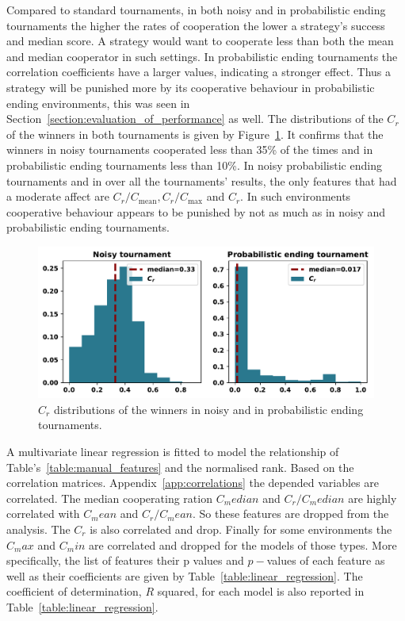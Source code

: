 \documentclass{article}
\begin{document}
Compared to standard tournaments, in both noisy and in probabilistic ending
tournaments the higher the rates of cooperation the lower a strategy's success
and median score. A strategy would want to cooperate less than both
the mean and median cooperator in such settings. In probabilistic ending
tournaments the correlation coefficients have a larger values, indicating a
stronger effect. Thus a strategy will be punished more by its cooperative
behaviour in probabilistic ending environments, this was seen in Section~\ref{section:evaluation_of_performance}
as well. The distributions of the $C_r$ of the winners in
both tournaments is given by Figure~\ref{fig:c_r_distributions}. It confirms
that the winners in noisy tournaments cooperated less than 35\% of the times
and in probabilistic ending tournaments less than 10\%.
In noisy probabilistic ending tournaments and in over all the tournaments' results,
the only features that had a moderate affect are $C_r/C_{\text{mean}},
C_r/C_{\text{max}}$ and $C_r$. In such environments cooperative behaviour
appears to be punished by not as much as in noisy and probabilistic ending
tournaments.

\begin{figure}[!htbp]
    \centering
    \includegraphics[width=.65\textwidth]{../images/c_r_winners_tournaments.pdf}
    \caption{$C_r$ distributions of the winners in noisy and in probabilistic
    ending tournaments.}\label{fig:c_r_distributions}
\end{figure}

A multivariate linear regression is fitted to model the relationship of
Table's~\ref{table:manual_features} and the normalised rank. Based on the
correlation matrices. Appendix~\ref{app:correlations} the depended variables are
correlated. The median cooperating ration \(C_median\) and \(C_r/ C_median\) are highly
correlated with \(C_mean\) and \(C_r / C_mean\). So these features are dropped from
the analysis. The \(C_r\) is also correlated and drop. Finally for some environments
the \(C_max\) and \(C_min\) are correlated and dropped for the models of those types.
More specifically, the list of features their p values and \(p-\)values of
each feature as well as their coefficients are given by
Table~\ref{table:linear_regression}. The coefficient of determination, \(R\)
squared, for each model is also reported in Table~\ref{table:linear_regression}.
\end{document}
